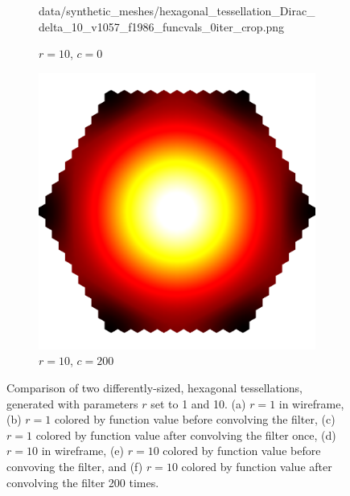 \begin{figure}[ht]
\begin{subfigure}[b]{0.32\linewidth}
		{data/synthetic_meshes/hexagonal_tessellation_Dirac_delta_10_v1057_f1986_funcvals_0iter_crop.png}
		\caption{$r=10$, $c=0$}\label{fig:hex.e}
	\end{subfigure}
	\begin{subfigure}[b]{0.32\linewidth}
		\includegraphics[width=\linewidth]
		{data/synthetic_meshes/hexagonal_tessellation_Dirac_delta_10_v1057_f1986_funcvals_200iter_crop.png}
		\caption{$r=10$, $c=200$}\label{fig:hex.f}
	\end{subfigure}
	\caption[Six Views Comparing Hexagonal Tessellations]{Comparison of two differently-sized, hexagonal tessellations, generated with parameters $r$ set to 1 and 10. (a) $r=1$ in wireframe, (b) $r=1$ colored by function value before convolving the filter, (c) $r=1$ colored by function value after convolving the filter once, (d) $r=10$ in wireframe, (e) $r=10$ colored by function value before convoving the filter, and (f) $r=10$ colored by function value after convolving the filter 200 times.}
	\label{fig:hex}
\end{figure}
